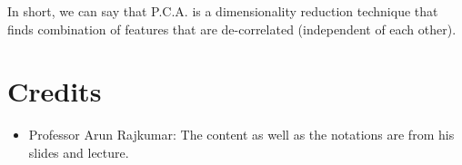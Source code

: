 \documentclass[letterpaper,11pt]{article}
\begin{document}
In short, we can say that P.C.A. is a dimensionality reduction technique that finds combination of features that are de-correlated (independent of each other).

\section{Credits}
\begin{itemize}
    \item Professor Arun Rajkumar: The content as well as the notations are from his slides and lecture.
\end{itemize}
\end{document}
